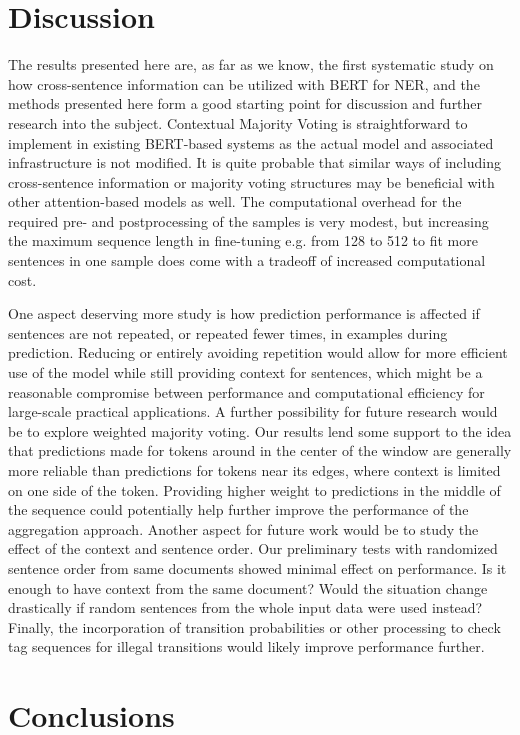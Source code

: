 \documentclass[11pt]{article}
\begin{document}
\section{Discussion}

The results presented here are, as far as we know, the first systematic study on how cross-sentence information can be utilized with BERT for NER, and the methods presented here form a good starting point for discussion and further research into the subject. Contextual Majority Voting is straightforward to implement in existing BERT-based systems as the actual model and associated infrastructure is not modified. It is quite probable that similar ways of including cross-sentence information or majority voting structures may be beneficial with other attention-based models as well. The computational overhead for the required pre- and postprocessing of the samples is very modest, but increasing the maximum sequence length in fine-tuning e.g. from 128 to 512 to fit more sentences in one sample does come with a tradeoff of increased computational cost.

One aspect deserving more study is how prediction performance is affected if sentences are not repeated, or repeated fewer times, in examples during prediction. Reducing or entirely avoiding repetition would allow for more efficient use of the model while still providing context for sentences, which might be a reasonable compromise between performance and computational efficiency for large-scale practical applications.
A further possibility for future research would be to explore weighted majority voting. Our results lend some support to the idea that predictions made for tokens around in the center of the window are generally more reliable than predictions for tokens near its edges, where context is limited on one side of the token. Providing higher weight to predictions in the middle of the sequence could potentially help further improve the performance of the aggregation approach. Another aspect for future work would be to study the effect of the context and sentence order. Our preliminary tests with randomized sentence order from same documents showed minimal effect on performance. Is it enough to have context from the same document? Would the situation change drastically if random sentences from the whole input data were used instead? Finally, the incorporation of transition probabilities or other processing to check tag sequences for illegal transitions would likely improve performance further.


\section{Conclusions}
\end{document}

